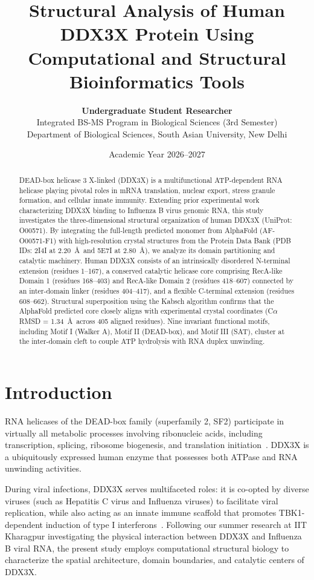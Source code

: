 \documentclass[11pt,a4paper]{article}
\title{\textbf{Structural Analysis of Human DDX3X Protein Using Computational and Structural Bioinformatics Tools}}
\author{\textbf{Undergraduate Student Researcher} \\
Integrated BS-MS Program in Biological Sciences (3rd Semester) \\
Department of Biological Sciences, South Asian University, New Delhi}
\date{Academic Year 2026--2027}
\begin{document}
\maketitle

\begin{abstract}
DEAD-box helicase 3 X-linked (DDX3X) is a multifunctional ATP-dependent RNA helicase playing pivotal roles in mRNA translation, nuclear export, stress granule formation, and cellular innate immunity. Extending prior experimental work characterizing DDX3X binding to Influenza B virus genomic RNA, this study investigates the three-dimensional structural organization of human DDX3X (UniProt: O00571). By integrating the full-length predicted monomer from AlphaFold (AF-O00571-F1) with high-resolution crystal structures from the Protein Data Bank (PDB IDs: 2I4I at 2.20~\AA\ and 5E7I at 2.80~\AA), we analyze its domain partitioning and catalytic machinery. Human DDX3X consists of an intrinsically disordered N-terminal extension (residues 1--167), a conserved catalytic helicase core comprising RecA-like Domain 1 (residues 168--403) and RecA-like Domain 2 (residues 418--607) connected by an inter-domain linker (residues 404--417), and a flexible C-terminal extension (residues 608--662). Structural superposition using the Kabsch algorithm confirms that the AlphaFold predicted core closely aligns with experimental crystal coordinates (C$\alpha$ RMSD = 1.34~\AA\ across 405 aligned residues). Nine invariant functional motifs, including Motif I (Walker A), Motif II (DEAD-box), and Motif III (SAT), cluster at the inter-domain cleft to couple ATP hydrolysis with RNA duplex unwinding.
\end{abstract}

\section{Introduction}
RNA helicases of the DEAD-box family (superfamily 2, SF2) participate in virtually all metabolic processes involving ribonucleic acids, including transcription, splicing, ribosome biogenesis, and translation initiation~\cite{linder2011}. DDX3X is a ubiquitously expressed human enzyme that possesses both ATPase and RNA unwinding activities. 

During viral infections, DDX3X serves multifaceted roles: it is co-opted by diverse viruses (such as Hepatitis C virus and Influenza viruses) to facilitate viral replication, while also acting as an innate immune scaffold that promotes TBK1-dependent induction of type I interferons~\cite{epling2015}. Following our summer research at IIT Kharagpur investigating the physical interaction between DDX3X and Influenza B viral RNA, the present study employs computational structural biology to characterize the spatial architecture, domain boundaries, and catalytic centers of DDX3X.
\end{document}
